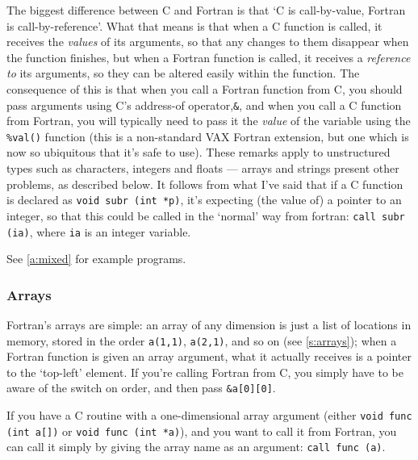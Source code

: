 \documentclass[11pt,oneside,chapters]{starlink}
\begin{document}
The biggest difference between C and Fortran is that `C
is call-by-value, Fortran is call-by-reference'.  What
that means is that when a C function is called, it
receives the \emph{values} of its arguments, so that any
changes to them disappear when the function finishes, but
when a Fortran function is called, it receives a
\emph{reference to} its arguments, so they can be
altered easily within the function.  The consequence of
this is that when you call a Fortran function from C, you
should pass arguments using C's address-of
operator,\texttt{\&}, and when you call a C
function from Fortran, you will typically need to pass it
the \emph{value} of the variable using the
\texttt{\%val()} function (this is a non-standard VAX
Fortran extension, but one which is now so ubiquitous that
it's safe to use).  These remarks apply to unstructured
types such as characters, integers and floats --- arrays
and strings present other problems, as described below.
It follows from what I've said that if a C function is
declared as \texttt{void subr (int *p)}, it's
expecting (the value of) a pointer to an integer, so that
this could be called in the `normal' way from fortran:
\texttt{call subr (ia)}, where \texttt{ia} is an
integer variable.

See \ref{a:mixed} for example programs.

\subsubsection{Arrays}

Fortran's arrays are simple: an array of any dimension
is just a list of locations in memory, stored in the
order \texttt{a(1,1)}, \texttt{a(2,1)}, and so
on (see \ref{s:arrays}); when a Fortran function
is given an array argument, what it actually receives is
a pointer to the `top-left' element.  If you're calling
Fortran from C, you simply have to be aware of the
switch on order, and then pass
\texttt{\&a[0][0]}.

If you have a C routine with a one-dimensional array
argument (either \texttt{void func (int a[])} or
\texttt{void func (int *a)}), and you want to call
it from Fortran, you can call it simply by giving the
array name as an argument: \texttt{call func (a)}.
\end{document}
